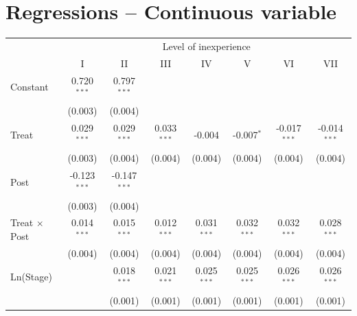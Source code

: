\documentclass[
]{article}
\begin{document}
\hypertarget{regressions-continuous-variable}{%
\section{Regressions -- Continuous
variable}\label{regressions-continuous-variable}}

\begingroup
\centering
\small
\begin{tabular}{lccccccc}
   \toprule
    & \multicolumn{7}{c}{Level of inexperience}\\
                                       & I              & II             & III           & IV            & V             & VI             & VII\\  
   Constant                            & 0.720$^{***}$  & 0.797$^{***}$  &               &               &               &                &   \\   
                                       & (0.003)        & (0.004)        &               &               &               &                &   \\   
   Treat                               & 0.029$^{***}$  & 0.029$^{***}$  & 0.033$^{***}$ & -0.004        & -0.007$^{*}$  & -0.017$^{***}$ & -0.014$^{***}$\\   
                                       & (0.003)        & (0.004)        & (0.004)       & (0.004)       & (0.004)       & (0.004)        & (0.004)\\   
   Post                                & -0.123$^{***}$ & -0.147$^{***}$ &               &               &               &                &   \\   
                                       & (0.003)        & (0.004)        &               &               &               &                &   \\   
   Treat $\times$ Post                 & 0.014$^{***}$  & 0.015$^{***}$  & 0.012$^{***}$ & 0.031$^{***}$ & 0.032$^{***}$ & 0.032$^{***}$  & 0.028$^{***}$\\   
                                       & (0.004)        & (0.004)        & (0.004)       & (0.004)       & (0.004)       & (0.004)        & (0.004)\\   
   Ln(Stage)                           &                & 0.018$^{***}$  & 0.021$^{***}$ & 0.025$^{***}$ & 0.025$^{***}$ & 0.026$^{***}$  & 0.026$^{***}$\\   
                                       &                & (0.001)        & (0.001)       & (0.001)       & (0.001)       & (0.001)        & (0.001)\\   

\end{tabular}
\end{document}
